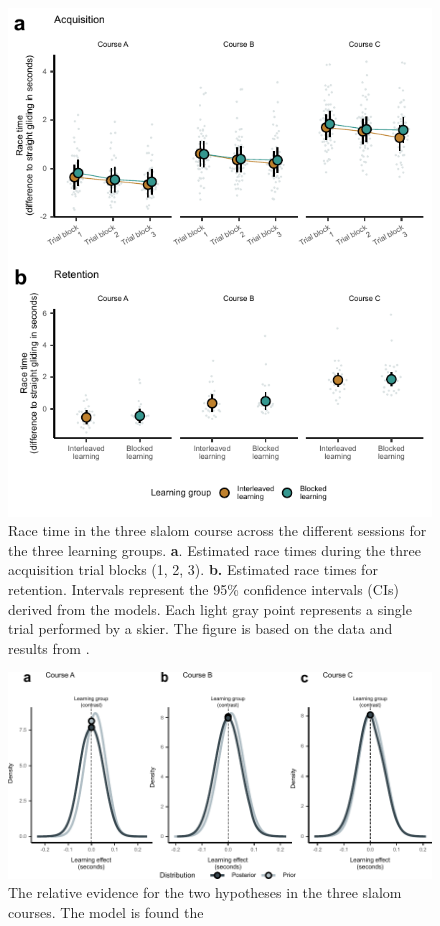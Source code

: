 \begin{figure}
    \centering
    \includegraphics[width=1\linewidth]{figure/figure_results_ci_acquisitionandretention_3.pdf}
    \caption[Short version for LoF]{Race time in the three slalom course across the different sessions for the three learning groups. \textbf{a}. Estimated race times during the three acquisition trial blocks (1, 2, 3). \textbf{b.} Estimated race times for retention. Intervals represent the 95\% confidence intervals (CIs) derived from the models. Each light gray point represents a single trial performed by a skier. The figure is based on the data and results from \cite{magelssen_is_2022}.}
    \label{fig:ci_results}
\end{figure}

\begin{figure}
    \centering
    \includegraphics[width=1\linewidth]{figure/figure_results_BF_4.pdf}
    \caption{The relative evidence for the two hypotheses in the three slalom courses. The model is found the }
    \label{fig:ci_bf}
\end{figure}


